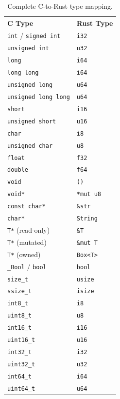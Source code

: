 \documentclass[11pt,a4paper]{article}
\begin{document}
\begin{appendices}
\begin{table}[h]
\centering
\caption{Complete C-to-Rust type mapping.}
\label{tab:typemap-full}
\begin{tabular}{ll}
\toprule
C Type & Rust Type \\
\midrule
\texttt{int} / \texttt{signed int} & \texttt{i32} \\
\texttt{unsigned int} & \texttt{u32} \\
\texttt{long} & \texttt{i64} \\
\texttt{long long} & \texttt{i64} \\
\texttt{unsigned long} & \texttt{u64} \\
\texttt{unsigned long long} & \texttt{u64} \\
\texttt{short} & \texttt{i16} \\
\texttt{unsigned short} & \texttt{u16} \\
\texttt{char} & \texttt{i8} \\
\texttt{unsigned char} & \texttt{u8} \\
\texttt{float} & \texttt{f32} \\
\texttt{double} & \texttt{f64} \\
\texttt{void} & \texttt{()} \\
\texttt{void*} & \texttt{*mut u8} \\
\texttt{const char*} & \texttt{\&str} \\
\texttt{char*} & \texttt{String} \\
\texttt{T*} (read-only) & \texttt{\&T} \\
\texttt{T*} (mutated) & \texttt{\&mut T} \\
\texttt{T*} (owned) & \texttt{Box<T>} \\
\texttt{\_Bool} / \texttt{bool} & \texttt{bool} \\
\texttt{size\_t} & \texttt{usize} \\
\texttt{ssize\_t} & \texttt{isize} \\
\texttt{int8\_t} & \texttt{i8} \\
\texttt{uint8\_t} & \texttt{u8} \\
\texttt{int16\_t} & \texttt{i16} \\
\texttt{uint16\_t} & \texttt{u16} \\
\texttt{int32\_t} & \texttt{i32} \\
\texttt{uint32\_t} & \texttt{u32} \\
\texttt{int64\_t} & \texttt{i64} \\
\texttt{uint64\_t} & \texttt{u64} \\
\bottomrule
\end{tabular}
\end{table}

\end{appendices}
\end{document}
